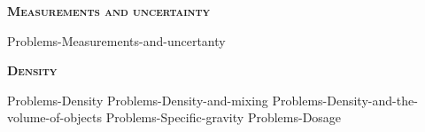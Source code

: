 \documentclass[main.tex]{subfiles}
\newcommand\chapterlabel{Ch-measurements}
\begin{document}
\begin{multicols*}{2}
 
{\raggedright\textsc{\textbf{Measurements and uncertainty }}\par}
{Problems-Measurements-and-uncertanty}


 \iftoggle{chem121}{}{  {\raggedright\textsc{\textbf{Matter}}\par}  {Problems-Mixtures} {Problems-States-of-matter}    }
{\raggedright\textsc{\textbf{Density}}\par}
{Problems-Density}
{Problems-Density-and-mixing}
{Problems-Density-and-the-volume-of-objects}
{Problems-Specific-gravity}
{Problems-Dosage}







 





\end{multicols*} \iftoggle{showfinalanswers}{
\newpage\fancyhfoffset[E,O]{0pt}
\begin{answerbox}
\begin{answersenvironment}
 \begin{localsize}{10}
{ \checkoddpage\ifoddpage    \else   \clearpage\thispagestyle{empty}\mbox{}\clearpage\fi
\Large \bf Answers}
\SetupExSheets{ headings = inline-nr , counter-format = qu) ,}
\printsolutions 
  \vspace{20cm}
 \end{localsize}
 \end{answersenvironment}
\end{answerbox}
}{}
\checkoddpage\ifoddpage   \clearpage\thispagestyle{empty}\mbox{}\clearpage \else   \fi
\end{document}
